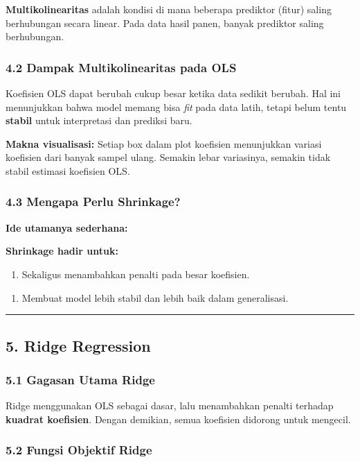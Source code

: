 \documentclass[12pt,a4paper]{article}
\begin{document}
\textbf{Multikolinearitas} adalah kondisi di mana beberapa prediktor (fitur) saling berhubungan secara linear. Pada data hasil panen, banyak prediktor saling berhubungan.


\subsubsection{4.2 Dampak Multikolinearitas pada OLS}

Koefisien OLS dapat berubah cukup besar ketika data sedikit berubah. Hal ini menunjukkan bahwa model memang bisa \emph{fit} pada data latih, tetapi belum tentu \textbf{stabil} untuk interpretasi dan prediksi baru.


\textbf{Makna visualisasi:} Setiap box dalam plot koefisien menunjukkan variasi koefisien dari banyak sampel ulang. Semakin lebar variasinya, semakin tidak stabil estimasi koefisien OLS.


\subsubsection{4.3 Mengapa Perlu Shrinkage?}

\textbf{Ide utamanya sederhana:}


\textbf{Shrinkage hadir untuk:}

\begin{enumerate}
\item Sekaligus menambahkan penalti pada besar koefisien.
\end{enumerate}

\begin{enumerate}
\item Membuat model lebih stabil dan lebih baik dalam generalisasi.
\end{enumerate}


\hrule


\subsection{5. Ridge Regression}

\subsubsection{5.1 Gagasan Utama Ridge}

Ridge menggunakan OLS sebagai dasar, lalu menambahkan penalti terhadap \textbf{kuadrat koefisien}. Dengan demikian, semua koefisien didorong untuk mengecil.


\subsubsection{5.2 Fungsi Objektif Ridge}
\end{document}
